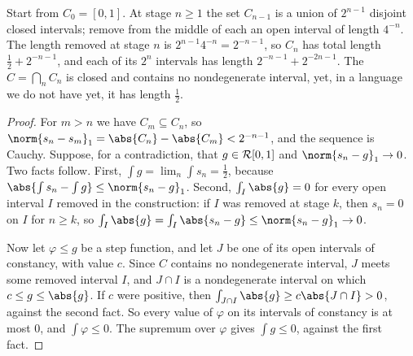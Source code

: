 \begin{refsection}
Start from $C_0=[0,1]$. At stage $n\ge1$ the set $C_{n-1}$ is a union of $2^{n-1}$ disjoint closed intervals; remove from the middle of each an open interval of length $4^{-n}$. The length removed at stage $n$ is $2^{n-1}4^{-n}=2^{-n-1}$, so $C_n$ has total length $\frac12+2^{-n-1}$, and each of its $2^n$ intervals has length $2^{-n-1}+2^{-2n-1}$. The  $C=\bigcap_n C_n$ is closed and contains no nondegenerate interval, yet, in a language we do not have yet, it has length $\frac12$.


\begin{proof}
For $m>n$ we have $C_m\subseteq C_n$, so $\norm{s_n-s_m}_1=\abs{C_n}-\abs{C_m}<2^{-n-1}$, and the sequence is Cauchy. Suppose, for a contradiction, that $g\in\mathcal{R}[0,1]$ and $\norm{s_n-g}_1\to0$. Two facts follow. First, $\int g=\lim_n\int s_n=\frac12$, because $\abs{\int s_n-\int g}\le\norm{s_n-g}_1$. Second, $\int_I\abs{g}=0$ for every open interval $I$ removed in the construction: if $I$ was removed at stage $k$, then $s_n=0$ on $I$ for $n\ge k$, so $\int_I\abs{g}=\int_I\abs{s_n-g}\le\norm{s_n-g}_1\to0$.

Now let $\varphi\le g$ be a step function, and let $J$ be one of its open intervals of constancy, with value $c$. Since $C$ contains no nondegenerate interval, $J$ meets some removed interval $I$, and $J\cap I$ is a nondegenerate interval on which $c\le g\le\abs{g}$. If $c$ were positive, then $\int_{J\cap I}\abs{g}\ge c\abs{J\cap I}>0$, against the second fact. So every value of $\varphi$ on its intervals of constancy is at most $0$, and $\int\varphi\le0$. The supremum over $\varphi$ gives $\int g\le0$, against the first fact.
\end{proof}


\end{refsection}
